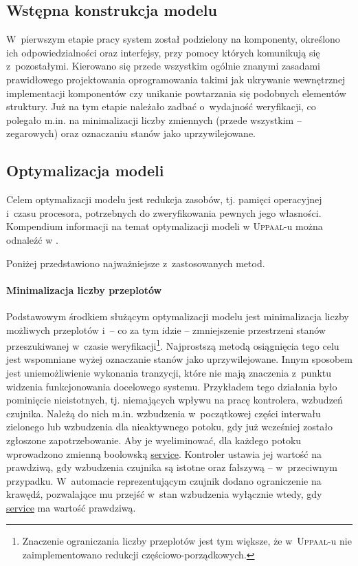 \documentclass{pracamgr}
\newcommand{\upp}{\textsc{Uppaal}}
\theoremstyle{plain}
\begin{document}
\subsection{Wstępna konstrukcja modelu}

W~pierwszym etapie pracy system został podzielony na komponenty,
określono ich odpowiedzialności oraz interfejsy, przy pomocy których
komunikują się z~pozostałymi. Kierowano się przede wszystkim ogólnie
znanymi zasadami prawidłowego projektowania oprogramowania takimi jak
ukrywanie wewnętrznej implementacji komponentów czy unikanie
powtarzania się podobnych elementów struktury. Już na tym etapie
należało zadbać o~wydajność weryfikacji, co polegało m.in. na
minimalizacji liczby zmiennych (przede wszystkim -- zegarowych) oraz
oznaczaniu stanów jako uprzywilejowane.

\subsection{Optymalizacja modeli}
\label{s:models:opt}

Celem optymalizacji modelu jest redukcja zasobów, tj. pamięci
operacyjnej i~czasu procesora, potrzebnych do zweryfikowania pewnych
jego własności. Kompendium informacji na temat optymalizacji modeli w
\upp-u można odnaleźć w \cite{tutorial04}.

Poniżej przedstawiono najważniejsze z~zastosowanych metod.

\paragraph{Minimalizacja liczby przeplotów} Podstawowym środkiem
służącym optymalizacji modelu jest minimalizacja liczby możliwych
przeplotów i~-- co za tym idzie -- zmniejszenie przestrzeni stanów
przeszukiwanej w~czasie weryfikacji\footnote{Znaczenie ograniczania
  liczby przeplotów jest tym większe, że w~\upp-u nie zaimplementowano
  redukcji częściowo-porządkowych.}. Najprostszą metodą osiągnięcia
tego celu jest wspomniane wyżej oznaczanie stanów jako uprzywilejowane.
Innym sposobem jest uniemożliwienie wykonania tranzycji, które nie
mają znaczenia z~punktu widzenia funkcjonowania docelowego
systemu. Przykładem tego działania było pominięcie nieistotnych,
tj. niemających wpływu na pracę kontrolera, wzbudzeń czujnika. Należą
do nich m.in. wzbudzenia w~początkowej części interwału zielonego lub
wzbudzenia dla nieaktywnego potoku, gdy już wcześniej zostało
zgłoszone zapotrzebowanie. Aby je wyeliminować, dla każdego potoku
wprowadzono zmienną boolowską \url{service}. Kontroler ustawia
jej wartość na prawdziwą, gdy wzbudzenia czujnika są istotne oraz
fałszywą -- w~przeciwnym przypadku. W~automacie reprezentującym
czujnik dodano ograniczenie na krawędź, pozwalające mu przejść w~stan
wzbudzenia wyłącznie wtedy, gdy \url{service} ma wartość prawdziwą.
\end{document}
